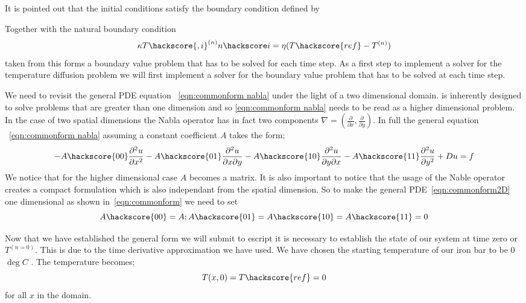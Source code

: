It is pointed out that the initial conditions satisfy the boundary condition defined by 

Together with the natural boundary condition 
\begin{equation}
 \kappa T\hackscore{,i}^{(n)} n\hackscore i = \eta (T\hackscore{ref}-T^{(n)}) 
\label{DIFFUSION TEMP EQ 2222}
\end{equation}
taken from 
this forms a boundary value problem that has to be solved for each time step. 
As a first step to implement a solver for the temperature diffusion problem we will 
first implement a solver for the  boundary value problem that has to be solved at each time step.

We need to revisit the general PDE equation ~\ref{eqn:commonform nabla} under the light of a two dimensional domain. \ESCRIPT is inherently designed to solve problems that are greater than one dimension and so \ref{eqn:commonform nabla} needs to be read as a higher dimensional problem. In the case of two spatial dimensions the Nabla operator has in fact two components $\nabla = (\frac{\partial}{\partial x}, \frac{\partial}{\partial y})$. In full the general equation ~\ref{eqn:commonform nabla} assuming a constant coefficient $A$ takes the form;
\begin{equation}\label{eqn:commonform2D}
-A\hackscore{00}\frac{\partial^{2}u}{\partial x^{2}} 
-A\hackscore{01}\frac{\partial^{2}u}{\partial x\partial y} 
-A\hackscore{10}\frac{\partial^{2}u}{\partial y\partial x} 
-A\hackscore{11}\frac{\partial^{2}u}{\partial y^{2}} 
+ Du = f
\end{equation}
We notice that for the higher dimensional case $A$ becomes a matrix. It is also
important to notice that the usage of the Nable operator creates
a compact formulation which is also independant from the spatial dimension. 
So to make the general PDE~\ref{eqn:commonform2D} one dimensional as
shown in~\ref{eqn:commonform} we need to set
\begin{equation}\label{eqn:commonform2D}
A\hackscore{00}=A; A\hackscore{01}=A\hackscore{10}=A\hackscore{11}=0
\end{equation}

Now that we have established the general form we will submit to escript it is necessary to establish the state of our system at time zero or $T^{(n=0)}$. This is due to the time derivative approximation we have used. We have chosen the starting temperature of our iron bar to be 0$\deg C$ . The temperature becomes;
\begin{equation}
T(x,0) = T\hackscore{ref} = 0
\end{equation}
for all $x$ in the domain. 

